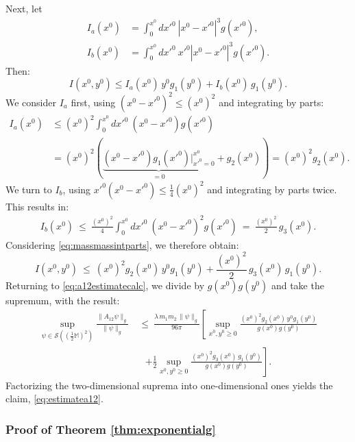 \documentclass[b5paper,draft,openbib,12pt]{memoir}
\newcommand{\M}{\mathbb{M}}
\begin{document}
Next, let
\begin{align}
	I_a(x^0) &= \int_0^{x^0} d {x'}^0~|x^0-{x'}^0|^3 g({x'}^0),\nonumber\\
	I_b(x^0) &=  \int_0^{x^0} d {x'}^0~{x'}^0 |x^0-{x'}^0|^3 g({x'}^0).
\end{align}
Then:
\begin{equation}
	I(x^0,y^0) \leq I_a(x^0) \, y^0 g_1(y^0) + I_b(x^0) \, g_1(y^0).
\label{eq:massmassintparts}
\end{equation}
We consider $I_a$ first, using $(x^0-{x'}^0)^2 \leq (x^0)^2$ and 
integrating by parts:
\begin{align}
	I_a(x^0) &\leq (x^0)^2 \int_0^{x^0} d {x'}^0~(x^0-{x'}^0)g({x'}^0)\\
&= (x^0)^2 \left( \underbrace{(x^0-{x'}^0)g_1({x'}^0)|_{{x'}^0 = 0}^{x^0}}_{=0} + g_2(x^0)\right) = (x^0)^2 g_2(x^0).\nonumber
\end{align}
We turn to $I_b$, using ${x'}^0(x^0-{x'}^0)\leq \frac{1}{4}(x^0)^2$ 
and integrating by parts twice. This results in:
\begin{align}
	I_b(x^0) ~\leq~ \frac{(x^0)^2}{4} \int_0^{x^0} d{x'}^0~ (x^0-{x'}^0)^2 g({x'}^0) ~=~ \frac{(x^0)^2}{2}\, g_3(x^0).
\end{align}
Considering \eqref{eq:massmassintparts}, we therefore obtain:
\begin{equation}
	I(x^0,y^0) ~\leq~ (x^0)^2 g_2(x^0)\, y^0 g_1(y^0) + \frac{(x^0)^2}{2}\, g_3(x^0)\, g_1(y^0).
\label{eq:resultmassmasstermgeneralg}
\end{equation}
Returning to \eqref{eq:a12estimatecalc}, we divide by $g(x^0)g(y^0)$ 
and take the supremum, with the result:
\begin{align}
	\sup_{\psi \in \mathcal{S}((\frac{1}{2}\M)^2)} \frac{\| A_{12} \psi \|_g}{\| \psi \|_g} ~&\leq~\frac{\lambda \, m_1 m_2 \, \| \psi \|_g}{96\pi} \left[ \sup_{x^0,y^0\geq 0} \frac{(x^0)^2 g_2(x^0)\, y^0 g_1(y^0)}{g(x^0)g(y^0)} \right.\nonumber\\
&~~~\left.+ \frac{1}{2} \sup_{x^0,y^0\geq 0} \frac{(x^0)^2 g_3(x^0)\, g_1(y^0)}{g(x^0)g(y^0)} \right].
\end{align}
Factorizing the two-dimensional suprema into one-dimensional ones 
yields the claim, \eqref{eq:estimatea12}.

\subsubsection{Proof of Theorem \ref{thm:exponentialg}} 
\label{sec:proofexponentialg}
\end{document}
